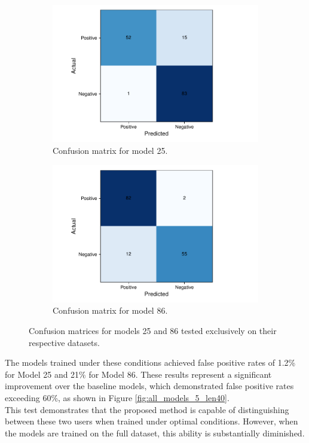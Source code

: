 \begin{figure}[H]
	\centering
	\begin{subfigure}{.5\textwidth}
		\centering
		\includegraphics[width=.99\textwidth]{images/confusion_matrix_25.pdf}
		\caption{Confusion matrix for model 25.}
		\label{fig:sub1}
	\end{subfigure}%
	\begin{subfigure}{.5\textwidth}
		\centering
		\includegraphics[width=.99\textwidth]{images/confusion_matrix_86.pdf}
		\caption{Confusion matrix for model 86.}
		\label{fig:sub2}
	\end{subfigure}
	\caption{Confusion matrices for models 25 and 86 tested exclusively on their respective datasets.}
	\label{user_vs_user}
\end{figure}

The models trained under these conditions achieved false positive rates of 1.2\% for Model 25 and 21\% for Model 86. These results represent a significant improvement over the baseline models, which demonstrated false positive rates exceeding 60\%, as shown in Figure \ref{fig:all_models_5_len40}.\\
This test demonstrates that the proposed method is capable of distinguishing between these two users when trained under optimal conditions. However, when the models are trained on the full dataset, this ability is substantially diminished.
